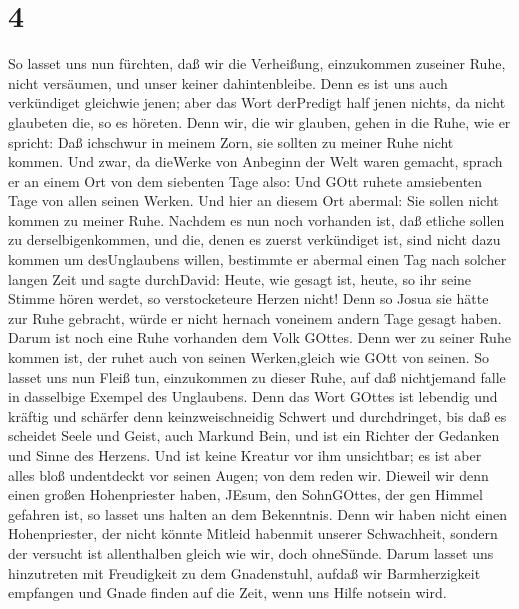 \hypertarget{section-2}{%
\section{4}\label{section-2}}

 So lasset uns nun fürchten, daß wir die Verheißung,
einzukommen zuseiner Ruhe, nicht versäumen, und unser keiner
dahintenbleibe.  Denn es ist uns auch verkündiget gleichwie
jenen; aber das Wort derPredigt half jenen nichts, da nicht glaubeten
die, so es höreten.  Denn wir, die wir glauben, gehen in die
Ruhe, wie er spricht: Daß ichschwur in meinem Zorn, sie sollten zu
meiner Ruhe nicht kommen. Und zwar, da dieWerke von Anbeginn der Welt
waren gemacht,  sprach er an einem Ort von dem siebenten
Tage also: Und GOtt ruhete amsiebenten Tage von allen seinen Werken.
 Und hier an diesem Ort abermal: Sie sollen nicht kommen zu
meiner Ruhe.  Nachdem es nun noch vorhanden ist, daß etliche
sollen zu derselbigenkommen, und die, denen es zuerst verkündiget ist,
sind nicht dazu kommen um desUnglaubens willen,  bestimmte
er abermal einen Tag nach solcher langen Zeit und sagte durchDavid:
Heute, wie gesagt ist, heute, so ihr seine Stimme hören werdet, so
verstocketeure Herzen nicht!  Denn so Josua sie hätte zur
Ruhe gebracht, würde er nicht hernach voneinem andern Tage gesagt haben.
 Darum ist noch eine Ruhe vorhanden dem Volk GOttes.
 Denn wer zu seiner Ruhe kommen ist, der ruhet auch von
seinen Werken,gleich wie GOtt von seinen.  So lasset uns
nun Fleiß tun, einzukommen zu dieser Ruhe, auf daß nichtjemand falle in
dasselbige Exempel des Unglaubens.  Denn das Wort GOttes
ist lebendig und kräftig und schärfer denn keinzweischneidig Schwert und
durchdringet, bis daß es scheidet Seele und Geist, auch Markund Bein,
und ist ein Richter der Gedanken und Sinne des Herzens. 
Und ist keine Kreatur vor ihm unsichtbar; es ist aber alles bloß
undentdeckt vor seinen Augen; von dem reden wir.  Dieweil
wir denn einen großen Hohenpriester haben, JEsum, den SohnGOttes, der
gen Himmel gefahren ist, so lasset uns halten an dem Bekenntnis.
 Denn wir haben nicht einen Hohenpriester, der nicht könnte
Mitleid habenmit unserer Schwachheit, sondern der versucht ist
allenthalben gleich wie wir, doch ohneSünde.  Darum lasset
uns hinzutreten mit Freudigkeit zu dem Gnadenstuhl, aufdaß wir
Barmherzigkeit empfangen und Gnade finden auf die Zeit, wenn uns Hilfe
notsein wird.

